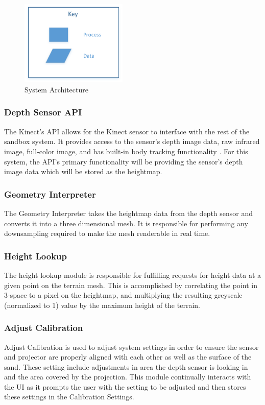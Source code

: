 \documentclass[onecolumn, draftclsnofoot,10pt, compsoc]{IEEEtran}
\begin{document}
\begin{figure}[H]
	\centering
	\includegraphics[width=2in]{SysArchKey}
    \caption{System Architecture}
\end{figure}

\subsubsection{Depth Sensor API} %

The Kinect's API allows for the Kinect sensor to interface with the rest of the sandbox system.
It provides access to the sensor's depth image data, raw infrared image, full-color image, and has built-in body tracking functionality \cite{kinect_api_overview}.
For this system, the API's primary functionality will be providing the sensor's depth image data which will be stored as the heightmap.


\subsubsection{Geometry Interpreter} %
The Geometry Interpreter takes the heightmap data from the depth sensor and converts it into a three dimensional mesh.
It is responsible for performing any downsampling required to make the mesh renderable in real time.

\subsubsection{Height Lookup}
The height lookup module is responsible for fulfilling requests for height data at a given point on the terrain mesh.
This is accomplished by correlating the point in 3-space to a pixel on the heightmap, and multiplying the resulting greyscale (normalized to 1) value by the maximum height of the terrain.

\subsubsection{Adjust Calibration} %
Adjust Calibration is used to adjust system settings in order to ensure the sensor and projector are properly aligned with each other as well as the surface of the sand.  
These setting include adjustments in area the depth sensor is looking in and the area covered by the projection.
This module continually interacts with the UI as it prompts the user with the setting to be adjusted and then stores these settings in the Calibration Settings.
\end{document}
